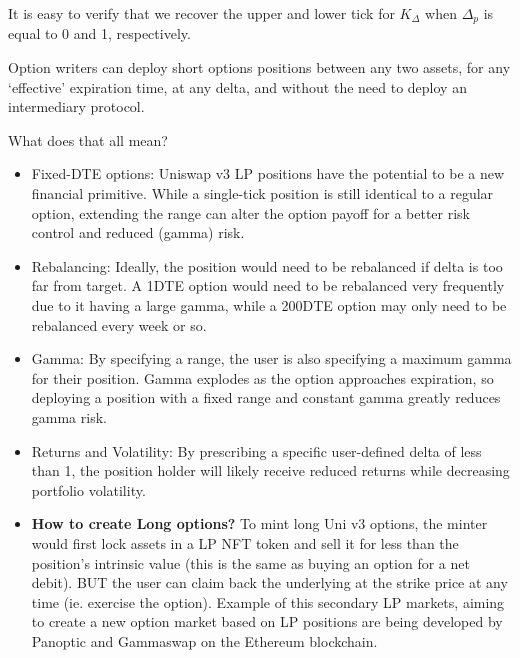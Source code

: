 \documentclass{article}
\begin{document}
It is easy to verify that we recover the upper and lower tick for $K_{\Delta}$ when  $\Delta_p$ is equal to 0 and 1, respectively.

Option writers can deploy short options positions between any two assets, for any ‘effective’ expiration time, at any delta, and without the need to deploy an intermediary protocol.

What does that all mean?

\begin{itemize}
    \item Fixed-DTE options: Uniswap v3 LP positions have the potential to be a new financial primitive. While a single-tick position is still identical to a regular option, extending the range can alter the option payoff for a better risk control and reduced (gamma) risk.
    \item Rebalancing: Ideally, the position would need to be rebalanced if delta is too far from target. A 1DTE option would need to be rebalanced very frequently due to it having a large gamma, while a 200DTE option may only need to be rebalanced every week or so.
    \item Gamma: By specifying a range, the user is also specifying a maximum gamma for their position. Gamma explodes as the option approaches expiration, so deploying a position with a fixed range and constant gamma greatly reduces gamma risk.
    \item Returns and Volatility: By prescribing a specific user-defined delta of less than 1, the position holder will likely receive reduced returns while decreasing portfolio volatility.
    \item \textbf{How to create Long options?} To mint long Uni v3 options, the minter would first lock assets in a LP NFT token and sell it for less than the position’s intrinsic value (this is the same as buying an option for a net debit). BUT the user can claim back the underlying at the strike price at any time (ie. exercise the option). Example of this secondary LP markets, aiming to create a new option market based on LP positions are being developed by Panoptic \cite{panoptic} and Gammaswap \cite{gammaswap} on the Ethereum blockchain.
\end{itemize}


\newpage
\end{document}
